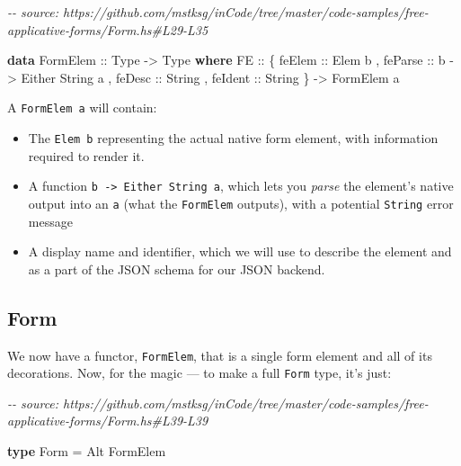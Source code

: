 \documentclass[]{article}
\newenvironment{Shaded}{}{}
\newcommand{\CommentTok}[1]{\textcolor[rgb]{0.38,0.63,0.69}{\textit{#1}}}
\newcommand{\DataTypeTok}[1]{\textcolor[rgb]{0.56,0.13,0.00}{#1}}
\newcommand{\KeywordTok}[1]{\textcolor[rgb]{0.00,0.44,0.13}{\textbf{#1}}}
\newcommand{\NormalTok}[1]{#1}
\newcommand{\OtherTok}[1]{\textcolor[rgb]{0.00,0.44,0.13}{#1}}
\begin{document}
\begin{Shaded}
\begin{Highlighting}[]
\CommentTok{{-}{-} source: https://github.com/mstksg/inCode/tree/master/code{-}samples/free{-}applicative{-}forms/Form.hs\#L29{-}L35}

\KeywordTok{data} \DataTypeTok{FormElem}\OtherTok{ ::} \DataTypeTok{Type} \OtherTok{{-}\textgreater{}} \DataTypeTok{Type} \KeywordTok{where}
    \DataTypeTok{FE}\OtherTok{ ::}\NormalTok{ \{}\OtherTok{ feElem  ::} \DataTypeTok{Elem}\NormalTok{ b}
\NormalTok{          ,}\OtherTok{ feParse ::}\NormalTok{ b }\OtherTok{{-}\textgreater{}} \DataTypeTok{Either} \DataTypeTok{String}\NormalTok{ a}
\NormalTok{          ,}\OtherTok{ feDesc  ::} \DataTypeTok{String}
\NormalTok{          ,}\OtherTok{ feIdent ::} \DataTypeTok{String}
\NormalTok{          \}}
        \OtherTok{{-}\textgreater{}} \DataTypeTok{FormElem}\NormalTok{ a}
\end{Highlighting}
\end{Shaded}

A \texttt{FormElem\ a} will contain:

\begin{itemize}
\tightlist
\item
  The \texttt{Elem\ b} representing the actual native form element, with
  information required to render it.
\item
  A function \texttt{b\ -\textgreater{}\ Either\ String\ a}, which lets you
  \emph{parse} the element's native output into an \texttt{a} (what the
  \texttt{FormElem} outputs), with a potential \texttt{String} error message
\item
  A display name and identifier, which we will use to describe the element and
  as a part of the JSON schema for our JSON backend.
\end{itemize}

\subsection{Form}\label{form}

We now have a functor, \texttt{FormElem}, that is a single form element and all
of its decorations. Now, for the magic --- to make a full \texttt{Form} type,
it's just:

\begin{Shaded}
\begin{Highlighting}[]
\CommentTok{{-}{-} source: https://github.com/mstksg/inCode/tree/master/code{-}samples/free{-}applicative{-}forms/Form.hs\#L39{-}L39}

\KeywordTok{type} \DataTypeTok{Form} \OtherTok{=} \DataTypeTok{Alt} \DataTypeTok{FormElem}
\end{Highlighting}
\end{Shaded}
\end{document}
